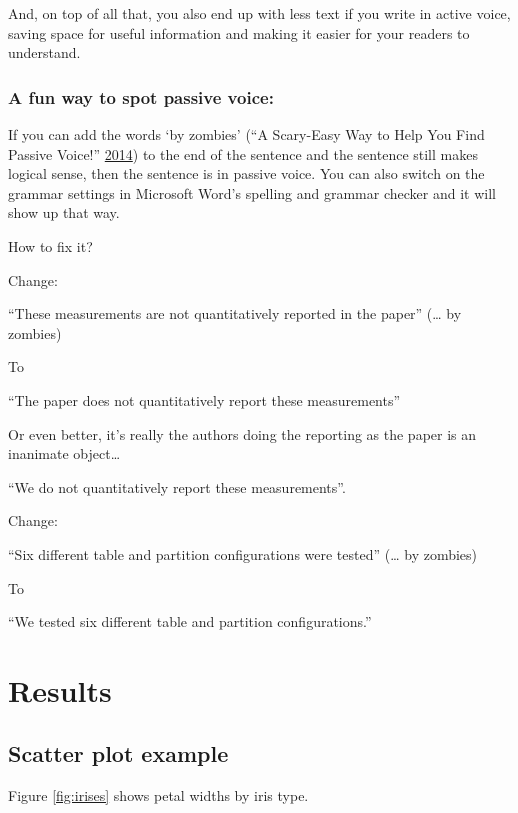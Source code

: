 \documentclass[]{elsarticle} %
\begin{document}
And, on top of all that, you also end up with less text if you write in active voice, saving space for useful information and making it easier for your readers to understand.

\hypertarget{a-fun-way-to-spot-passive-voice}{%
\subsubsection{A fun way to spot passive voice:}\label{a-fun-way-to-spot-passive-voice}}

If you can add the words `by zombies' (``A Scary-Easy Way to Help You Find Passive Voice!'' \protect\hyperlink{ref-ScaryeasyWayHelp2014}{2014}) to the end of the sentence and the sentence still makes logical sense, then the sentence is in passive voice. You can also switch on the grammar settings in Microsoft Word's spelling and grammar checker and it will show up that way.

How to fix it?

Change:

``These measurements are not quantitatively reported in the paper'' (\ldots{} by zombies)

To

``The paper does not quantitatively report these measurements''

Or even better, it's really the authors doing the reporting as the paper is an inanimate object\ldots{}

``We do not quantitatively report these measurements''.

Change:

``Six different table and partition configurations were tested'' (\ldots{} by zombies)

To

``We tested six different table and partition configurations.''

\hypertarget{results}{%
\section{Results}\label{results}}

\hypertarget{scatter-plot-example}{%
\subsection{Scatter plot example}\label{scatter-plot-example}}

Figure \ref{fig:irises} shows petal widths by iris type.
\end{document}
